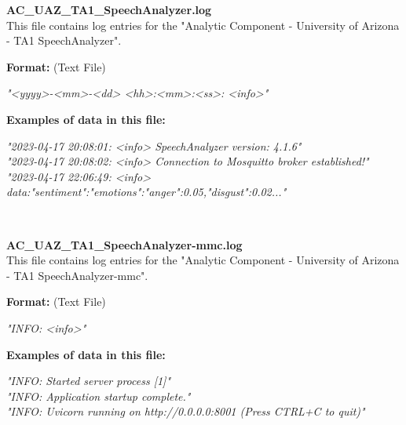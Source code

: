 \begin{description}
\begin{addmargin}[0em]{0em}
    \label{AC_UAZ_TA1_SpeechAnalyzer.log}
    \begin{addmargin}[1em]{0em} %
        \textbf{AC\_UAZ\_TA1\_SpeechAnalyzer.log}\\
        This file contains log entries for the "Analytic Component - University of Arizona - TA1 SpeechAnalyzer".
        \begin{addmargin}[1em]{0em}
            \textbf{Format:} (Text File)
            \begin{addmargin}[1em]{0em}
                \textit{"<yyyy>-<mm>-<dd> <hh>:<mm>:<ss>: <info>"}
            \end{addmargin}
        \end{addmargin}
        \begin{addmargin}[1em]{0em}
            \textbf{Examples of data in this file:}
            \begin{addmargin}[1em]{0em}\textit{"2023-04-17 20:08:01: <info> SpeechAnalyzer version: 4.1.6"\\
                "2023-04-17 20:08:02: <info> Connection to Mosquitto broker established!"\\
                "2023-04-17 22:06:49: <info> data:"sentiment":"emotions":"anger":0.05,"disgust":0.02..."}
            \end{addmargin}
        \end{addmargin}
    \end{addmargin} %
    \textbf{\\}

    \label{AC_UAZ_TA1_SpeechAnalyzer-mmc.log}
    \begin{addmargin}[1em]{0em} %
        \textbf{AC\_UAZ\_TA1\_SpeechAnalyzer-mmc.log}\\
        This file contains log entries for the "Analytic Component - University of Arizona - TA1 SpeechAnalyzer-mmc".
        \begin{addmargin}[1em]{0em}
            \textbf{Format:} (Text File)
            \begin{addmargin}[1em]{0em}
                \textit{"INFO: <info>"}
            \end{addmargin}
        \end{addmargin}
        \begin{addmargin}[1em]{0em}
            \textbf{Examples of data in this file:}
            \begin{addmargin}[1em]{0em}\textit{"INFO: Started server process [1]"\\
                "INFO: Application startup complete."\\
                "INFO: Uvicorn running on http://0.0.0.0:8001 (Press CTRL+C to quit)"}
            \end{addmargin}
        \end{addmargin}
    \end{addmargin} %
    \textbf{\\}


\end{addmargin}
\end{description}
